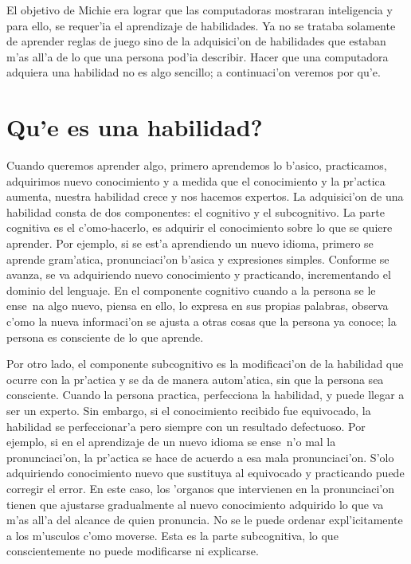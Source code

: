 \documentclass[11pt]{article}
\begin{document}
El objetivo de Michie era lograr que las computadoras mostraran inteligencia y para ello, se requer'ia el aprendizaje de habilidades. Ya no se trataba solamente de aprender reglas de juego sino de la adquisici'on de habilidades que estaban m'as all'a de lo que una persona pod'ia describir. Hacer que una computadora adquiera una habilidad no es algo sencillo; a continuaci'on veremos por qu'e.

\section{\textquestiondown Qu'e es una habilidad?} 

Cuando queremos aprender algo, primero aprendemos lo b'asico, practicamos, adquirimos nuevo conocimiento y a medida que el conocimiento y la pr'actica aumenta, nuestra habilidad crece y nos hacemos expertos. La adquisici'on de una habilidad consta de dos componentes: el cognitivo y el subcognitivo. La parte cognitiva es el c'omo-hacerlo, es adquirir el conocimiento sobre lo que se quiere aprender. Por ejemplo, si se est'a aprendiendo un nuevo idioma, primero se aprende gram'atica, pronunciaci'on b'asica y expresiones simples. Conforme se avanza, se va adquiriendo nuevo conocimiento y practicando, incrementando el dominio del lenguaje. En el componente cognitivo cuando a la persona se le ense~na algo nuevo, piensa en ello, lo expresa en sus propias palabras, observa c'omo la nueva informaci'on se ajusta a otras cosas que la persona ya conoce; la persona es consciente de lo que aprende.

\medskip
Por otro lado, el componente subcognitivo es la modificaci'on de la habilidad que ocurre con la pr'actica y se da de manera autom'atica, sin que la persona sea consciente. Cuando la persona practica, perfecciona la habilidad, y puede llegar a ser un experto. Sin embargo, si el conocimiento recibido fue equivocado, la habilidad se perfeccionar'a pero siempre con un resultado defectuoso. Por ejemplo, si en el aprendizaje de un nuevo idioma se ense~n'o mal la pronunciaci'on, la pr'actica se hace de acuerdo a esa mala pronunciaci'on. S'olo adquiriendo conocimiento nuevo que sustituya al equivocado y practicando puede corregir el error. En este caso, los 'organos que intervienen en la pronunciaci'on tienen que ajustarse gradualmente al nuevo conocimiento adquirido lo que va m'as all'a del alcance de quien pronuncia. No se le puede ordenar expl'icitamente a los m'usculos c'omo moverse. Esta es la parte subcognitiva, lo que conscientemente no puede modificarse ni explicarse.
\end{document}
